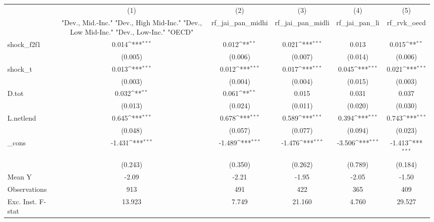 {
\def\sym#1{\ifmmode^{#1}\else\(^{#1}\)\fi}
\begin{tabular}{l*{5}{c}}
\toprule
            &\multicolumn{1}{c}{(1)}&\multicolumn{1}{c}{(2)}&\multicolumn{1}{c}{(3)}&\multicolumn{1}{c}{(4)}&\multicolumn{1}{c}{(5)}\\
            &\multicolumn{1}{c}{ "Dev., Mid.-Inc." "Dev., High Mid-Inc." "Dev., Low Mid-Inc." "Dev., Low-Inc." "OECD" }&\multicolumn{1}{c}{rf\_jai\_pan\_midhi}&\multicolumn{1}{c}{rf\_jai\_pan\_midli}&\multicolumn{1}{c}{rf\_jai\_pan\_li}&\multicolumn{1}{c}{rf\_rvk\_oecd}\\
\midrule
shock\_f2f1  &       0.014\sym{***}&       0.012\sym{**} &       0.021\sym{***}&       0.013         &       0.015\sym{**} \\
            &     (0.005)         &     (0.006)         &     (0.007)         &     (0.014)         &     (0.006)         \\
\addlinespace
shock\_t     &       0.013\sym{***}&       0.012\sym{***}&       0.017\sym{***}&       0.045\sym{***}&       0.021\sym{***}\\
            &     (0.003)         &     (0.004)         &     (0.004)         &     (0.015)         &     (0.003)         \\
\addlinespace
D.tot       &       0.032\sym{**} &       0.061\sym{**} &       0.015         &       0.031         &       0.037         \\
            &     (0.013)         &     (0.024)         &     (0.011)         &     (0.020)         &     (0.030)         \\
\addlinespace
L.netlend   &       0.645\sym{***}&       0.678\sym{***}&       0.589\sym{***}&       0.394\sym{***}&       0.743\sym{***}\\
            &     (0.048)         &     (0.057)         &     (0.077)         &     (0.094)         &     (0.023)         \\
\addlinespace
\_cons      &      -1.431\sym{***}&      -1.489\sym{***}&      -1.476\sym{***}&      -3.506\sym{***}&      -1.413\sym{***}\\
            &     (0.243)         &     (0.350)         &     (0.262)         &     (0.789)         &     (0.184)         \\
\midrule
Mean Y      &       -2.09         &       -2.21         &       -1.95         &       -2.05         &       -1.50         \\
Observations&         913         &         491         &         422         &         365         &         409         \\
Exc. Inst. F-stat&      13.923         &       7.749         &      21.160         &       4.760         &      29.527         \\
\bottomrule
\end{tabular}
}
